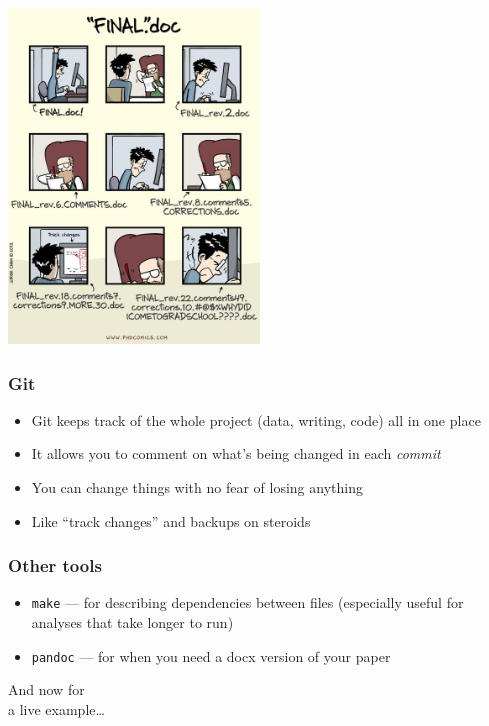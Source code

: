 \documentclass[bigger, aspectratio=169]{beamer}
\begin{document}
\begin{frame}
    \centering
    \includegraphics[width=0.5\textwidth]{final.jpg}
\end{frame}

\begin{frame}
  \frametitle{Git}
  \begin{itemize}
  \item Git keeps track of the whole project (data, writing, code) all in one place
  \item It allows you to comment on what's being changed in each \emph{commit}
  \item You can change things with no fear of losing anything
  \item Like ``track changes'' and backups on steroids
  \end{itemize}
\end{frame}

\begin{frame}
  \frametitle{Other tools}
  \begin{itemize}
  \item \texttt{make} --- for describing dependencies between files (especially useful for analyses that take longer to run)
  \item \texttt{pandoc} --- for when you need a docx version of your paper
  \end{itemize}
\end{frame}

{
  \begin{frame}
    And now for \\
    a live example\ldots
  \end{frame}
}
\end{document}
